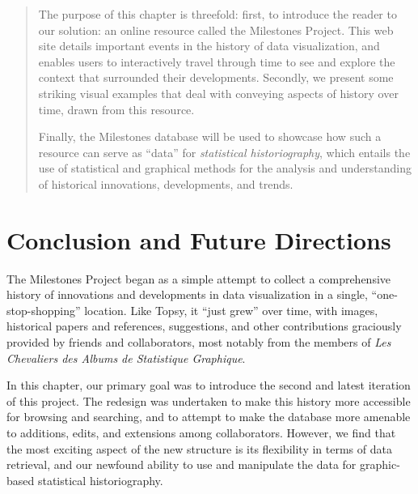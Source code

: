 \documentclass[11pt]{article}
\begin{document}
\begin{abstract}
\begin{comment}
Approaches to modern data visualization have evolved substantially from the first thematic maps of the 1600s and the first bar charts and line graphs in the early 1800s to the dynamic and interactive graphics of today. Over the course of this history, there have been many detailed written studies, both comprehensive and on particular aspects. But there has never been an attempt to collect this history in a single place for display, search or query and even data analysis or graphics based on this history.
\end{comment}

The purpose of this chapter is threefold: first, to introduce the reader to our solution: an online resource called the Milestones Project. This web site details  important events in the history of data visualization, and enables users to interactively travel through time to see and explore the context that surrounded their developments. 
Secondly, we present some striking visual examples that deal with conveying aspects of history over time, drawn from this resource.

Finally, the Milestones database will be used to showcase how such a resource can serve as ``data'' for \emph{statistical historiography}, which entails the use of statistical and graphical methods for the analysis and understanding of historical innovations, developments, and trends.
\end{abstract}


\section{Conclusion and Future Directions}
The Milestones Project began as a simple attempt to collect a comprehensive history of innovations and developments in data visualization in a single, ``one-stop-shopping'' location. Like Topsy, it ``just grew'' over time, with images, historical papers and references, suggestions, and other contributions graciously provided by friends and collaborators, most notably from the members of \emph{Les Chevaliers des Albums de Statistique Graphique}.

In this chapter, our primary goal was to introduce the second and latest iteration of this project.  The redesign was undertaken to make this history more accessible for browsing and searching, and to attempt to make the database more amenable to additions, edits, and extensions among collaborators.  However, we find that the most exciting aspect of the new structure is its flexibility in terms of data retrieval, and our newfound ability to use and manipulate the data for graphic-based statistical historiography.

%
\end{document}
